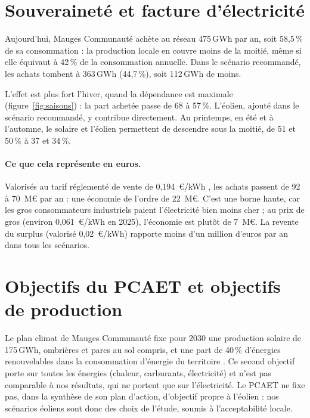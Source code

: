 \documentclass[11pt, a4paper]{report}
\newcommand{\pct}{\,\%}
\newcommand{\gwh}{\,GWh}
\begin{document}
\section{Souveraineté et facture d'électricité}

Aujourd'hui, Mauges Communauté achète au réseau 475\gwh{} par an, soit 58,5\pct{} de sa consommation : la production locale en couvre moins de la moitié, même si elle équivaut à 42\pct{} de la consommation annuelle. Dans le scénario recommandé, les achats tombent à 363\gwh{} (44,7\pct), soit 112\gwh{} de moins.

L'effet est plus fort l'hiver, quand la dépendance est maximale (figure~\ref{fig:saisons}) : la part achetée passe de 68 à 57\pct. L'éolien, ajouté dans le scénario recommandé, y contribue directement. Au printemps, en été et à l'automne, le solaire et l'éolien permettent de descendre sous la moitié, de 51 et 50\pct{} à 37 et 34\pct.


\paragraph{Ce que cela représente en euros.} Valorisés au tarif réglementé de vente de 0,194~\euro/kWh \cite{cre_trve}, les achats passent de 92 à 70~M\euro{} par an : une économie de l'ordre de 22~M\euro. C'est une borne haute, car les gros consommateurs industriels paient l'électricité bien moins cher ; au prix de gros (environ 0,061~\euro/kWh en 2025), l'économie est plutôt de 7~M\euro. La revente du surplus (valorisé 0,02~\euro/kWh) rapporte moins d'un million d'euros par an dans tous les scénarios.

\section{Objectifs du PCAET et objectifs de production}

Le plan climat de Mauges Communauté fixe pour 2030 une production solaire de 175\gwh, ombrières et parcs au sol compris, et une part de 40\pct{} d'énergies renouvelables dans la consommation d'énergie du territoire \cite{pcaet_mauges}. Ce second objectif porte sur toutes les énergies (chaleur, carburants, électricité) et n'est pas comparable à nos résultats, qui ne portent que sur l'électricité. Le PCAET ne fixe pas, dans la synthèse de son plan d'action, d'objectif propre à l'éolien : nos scénarios éoliens sont donc des choix de l'étude, soumis à l'acceptabilité locale.
\end{document}
